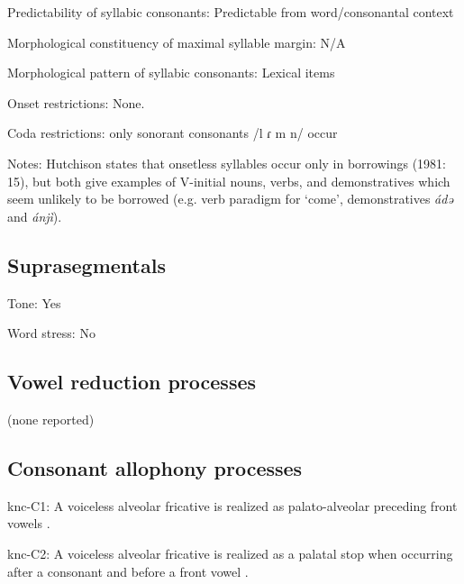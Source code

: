 {\begin{appendixdesc}
\item[Predictability of syllabic consonants:] Predictable from word/consonantal context

\item[Morphological constituency of maximal syllable margin:] N/A

\item[Morphological pattern of syllabic consonants:] Lexical items

\item[Onset restrictions:] None.

\item[Coda restrictions:] only sonorant consonants /l ɾ m n/ occur \citep[15]{Hutchison1981}

\item[Notes:] Hutchison states that onsetless syllables occur only in borrowings (1981: 15), but both \citet{HutchisonCyffer1998} give examples of V-initial nouns, verbs, and demonstratives which seem unlikely to be borrowed (e.g. verb paradigm for ‘come’, demonstratives \textit{ádə} and \textit{ánjì}).
\end{appendixdesc}
\subsection*{Suprasegmentals}
\begin{appendixdesc}
\item[Tone:] Yes

\item[Word stress:] No
\end{appendixdesc}
\subsection*{Vowel reduction processes}

(none reported)
\subsection*{Consonant allophony processes}
\begin{appendixdesc}

\item[knc-C1:] A voiceless alveolar fricative is realized as palato-alveolar preceding front vowels \citep[20]{Cyffer1998}.

\item[knc-C2:] A voiceless alveolar fricative is realized as a palatal stop when occurring after a consonant and before a front vowel \citep[21]{Cyffer1998}.


\end{appendixdesc}}
